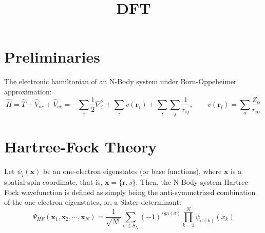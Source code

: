 \documentclass[a4paper, 12pt]{report}
\begin{document}
\title{DFT}
\maketitle

\section{Preliminaries}
The electronic hamiltonian of an N-Body system under Born-Oppeheimer approximation:
\begin{equation}
\hat H = \hat T + \hat V_{ne} + \hat V_{ee}
= -\sum_i\frac{1}{2}\nabla^2_i + \sum_i v(\mathbf r_i) + \sum_i\sum_j\frac{1}{r_{ij}},\quad\quad
v(\mathbf r_i) = \sum_\alpha\frac{Z_\alpha}{r_{i\alpha}}
\end{equation}

\section{Hartree-Fock Theory}
Let $\psi_i(\mathbf x)$ be an one-electron eigenstates (or base functions), where $\mathbf x$ is a spatial-spin coordinate, that is, $\mathbf x = \{\mathbf r, s\}$. Then, the N-Body system Hartree-Fock wavefunction is defined as simply being the anti-symmetrized combination of the one-electron eigenstates, or, a Slater determinant:
\begin{equation}
\Psi_{HF}(\mathbf x_1, \mathbf x_2, \cdots, \mathbf x_N) = \frac{1}{\sqrt{N!}}\sum_{\sigma\in S_N}(-1)^{sgn(\sigma)}\prod_{k=1}^N\psi_{\sigma(k)}(x_k)
\end{equation}
\end{document}
